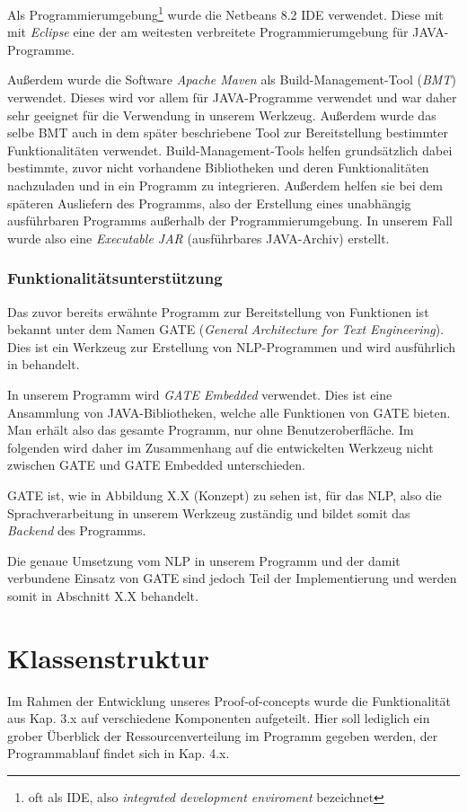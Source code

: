 \documentclass[12pt]{report}
\begin{document}
Als Programmierumgebung\footnote{oft als IDE, also \textit{integrated development enviroment} bezeichnet} wurde die Netbeans 8.2 IDE verwendet. Diese mit mit \textit{Eclipse} eine der am weitesten verbreitete Programmierumgebung für JAVA-Programme. 

Außerdem wurde die Software \textit{Apache Maven} als Build-Management-Tool (\textit{BMT}) verwendet. Dieses wird vor allem für JAVA-Programme verwendet und war daher sehr geeignet für die Verwendung in unserem Werkzeug. Außerdem wurde das selbe BMT auch in dem später beschriebene Tool zur Bereitstellung bestimmter Funktionalitäten verwendet. 
Build-Management-Tools helfen grundsätzlich dabei bestimmte, zuvor nicht vorhandene Bibliotheken und deren Funktionalitäten nachzuladen und in ein Programm zu integrieren. Außerdem helfen sie bei dem späteren Ausliefern des Programms, also der Erstellung eines unabhängig ausführbaren Programms außerhalb der Programmierumgebung.
In unserem Fall wurde also eine \textit{Executable JAR} (ausführbares JAVA-Archiv) erstellt. 

\subsubsection{Funktionalitätsunterstützung}

Das zuvor bereits erwähnte Programm zur Bereitstellung von Funktionen ist bekannt unter dem Namen GATE (\textit{General Architecture for Text Engineering}). Dies ist ein Werkzeug zur Erstellung von NLP-Programmen und wird ausführlich in \cite{rs18} behandelt. 

In unserem Programm wird \textit{GATE Embedded} verwendet. Dies ist eine Ansammlung von JAVA-Bibliotheken, welche alle Funktionen von GATE bieten. Man erhält also das gesamte Programm, nur ohne Benutzeroberfläche. Im folgenden wird daher im Zusammenhang auf die entwickelten Werkzeug nicht zwischen GATE und GATE Embedded unterschieden. 

GATE ist, wie in Abbildung X.X (Konzept) zu sehen ist, für das NLP, also die Sprachverarbeitung in unserem Werkzeug zuständig und bildet somit das \textit{Backend} des Programms.

Die genaue Umsetzung vom NLP in unserem Programm und der damit verbundene Einsatz von GATE sind jedoch Teil der Implementierung und werden somit in Abschnitt X.X behandelt.

\section{Klassenstruktur}
Im Rahmen der Entwicklung unseres Proof-of-concepts wurde die Funktionalität aus Kap. 3.x auf verschiedene Komponenten aufgeteilt. Hier soll lediglich ein grober Überblick der Ressourcenverteilung im Programm gegeben werden, der Programmablauf findet sich in Kap. 4.x.
\end{document}
